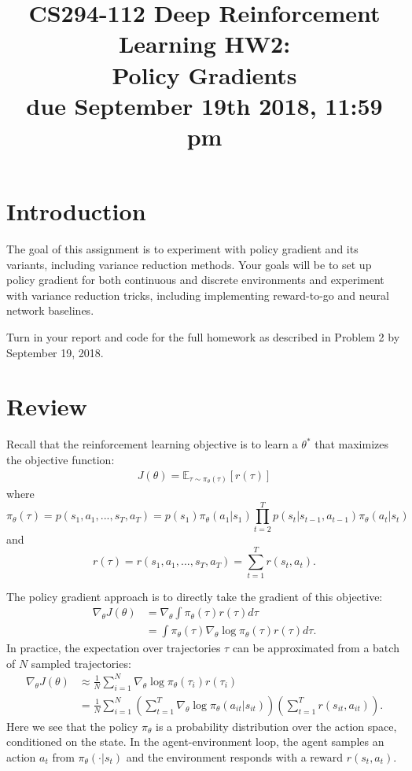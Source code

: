 \documentclass[12pt]{article}
\title{CS294-112 Deep Reinforcement Learning HW2: \\ Policy Gradients\\
\textbf{due September 19th 2018, 11:59 pm}}
\author{
}
\date{}
\begin{document}
\maketitle

\section{Introduction}
The goal of this assignment is to experiment with policy gradient and its variants, including variance reduction methods. Your goals will be to set up policy gradient for both continuous and discrete environments and experiment with variance reduction tricks, including implementing reward-to-go and neural network baselines.

Turn in your report and code for the full homework as described in Problem 2 by September 19, 2018.

\section{Review}
Recall that the reinforcement learning objective is to learn a $\theta^*$ that maximizes the objective function:
\begin{align} \label{objective}
J(\theta) = \mathbb{E}_{\tau \sim \pi_\theta(\tau)} \left[r(\tau)\right]
\end{align}
where 
$$\pi_\theta(\tau) = p(s_1, a_1, ..., s_T, a_T) = p(s_1)\pi_\theta(a_1|s_1) \prod_{t=2}^T p(s_t | s_{t-1}, a_{t-1}) \pi_\theta(a_t | s_t)$$
and 
$$r(\tau) = r(s_1, a_1, ..., s_T, a_T) = \sum_{t=1}^T r(s_t, a_t).$$

The policy gradient approach is to directly take the gradient of this objective:
\begin{align}
\nabla_\theta J(\theta) &= \nabla_\theta \int \pi_\theta(\tau) r(\tau) d\tau \\
&= \int \pi_\theta(\tau) \nabla_\theta \log \pi_\theta(\tau) r(\tau) d\tau.
\end{align}
In practice, the expectation over trajectories $\tau$ can be approximated from a batch of $N$ sampled trajectories:
\begin{align}
\nabla_\theta J(\theta) &\approx \frac{1}{N} \sum_{i=1}^N \nabla_\theta \log \pi_\theta(\tau_i) r(\tau_i) \\
&= \frac{1}{N} \sum_{i=1}^N \left(\sum_{t=1}^T \nabla_\theta \log \pi_\theta(a_{it} | s_{it})\right)\left(\sum_{t=1}^T r(s_{it}, a_{it})\right).
\end{align}
Here we see that the policy $\pi_\theta$ is a probability distribution over the action space, conditioned on the state. In the agent-environment loop, the agent samples an action $a_t$ from $\pi_\theta(\cdot | s_t)$ and the environment responds with a reward $r(s_t, a_t)$.
\end{document}
